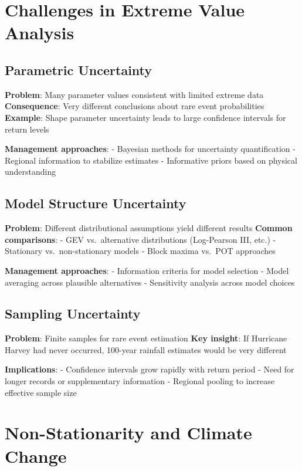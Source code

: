 \documentclass[
  letterpaper,
  DIV=11,
  numbers=noendperiod]{scrreprt}
\begin{document}
\section{Challenges in Extreme Value
Analysis}\label{challenges-in-extreme-value-analysis}

\subsection{Parametric Uncertainty}\label{parametric-uncertainty}

\textbf{Problem}: Many parameter values consistent with limited extreme
data \textbf{Consequence}: Very different conclusions about rare event
probabilities \textbf{Example}: Shape parameter uncertainty leads to
large confidence intervals for return levels

\textbf{Management approaches}: - Bayesian methods for uncertainty
quantification - Regional information to stabilize estimates -
Informative priors based on physical understanding

\subsection{Model Structure
Uncertainty}\label{model-structure-uncertainty}

\textbf{Problem}: Different distributional assumptions yield different
results \textbf{Common comparisons}: - GEV vs.~alternative distributions
(Log-Pearson III, etc.) - Stationary vs.~non-stationary models - Block
maxima vs.~POT approaches

\textbf{Management approaches}: - Information criteria for model
selection - Model averaging across plausible alternatives - Sensitivity
analysis across model choices

\subsection{Sampling Uncertainty}\label{sampling-uncertainty}

\textbf{Problem}: Finite samples for rare event estimation \textbf{Key
insight}: If Hurricane Harvey had never occurred, 100-year rainfall
estimates would be very different

\textbf{Implications}: - Confidence intervals grow rapidly with return
period - Need for longer records or supplementary information - Regional
pooling to increase effective sample size

\section{Non-Stationarity and Climate
Change}\label{non-stationarity-and-climate-change-1}
\end{document}
